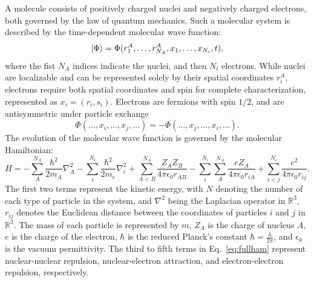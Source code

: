 \documentclass[../main.tex]{subfiles}
\begin{document}
A molecule consists of positively charged nuclei and negatively charged electrons, both governed by the law of quantum mechanics. Such a molecular system is described by the time-dependent molecular wave function:
\begin{equation}
    \ket{\Phi} = \Phi (r_1^A, \dots, r_{N_A}^A,x_1, \dots, x_{N_i},t) , 
\end{equation} where the fist $N_A$ indices indicate the nuclei, and then $N_i$ electrons. While nuclei are localizable and can be represented solely by their spatial coordinates $r_i^A$, electrons require both spatial coordinates and spin for complete characterization, represented as $x_i = (r_i, s_i)$. Electrons are fermions with spin $1/2$, and are antisymmetric under particle exchange
\begin{equation}
    \Phi(\dots, x_i, \dots, x_j, \dots) = - \Phi(\dots, x_j, \dots, x_i, \dots).
\end{equation}
The evolution of the molecular wave function is governed by the molecular Hamiltonian:
\begin{equation}\label{eq:fullham}
    H = -\sum^{N_A}_A \frac{\hbar^2}{2 m_A} \nabla^2_A - \sum^{N_i}_i \frac{\hbar^2}{2 m_e} \nabla^2_i + \sum^{N_A}_{A<B} \frac{Z_A Z_B}{4 \pi \epsilon_0 r_{AB}} - \sum^{N_i}_i \sum^{N_A}_{A} \frac{e Z_A}{4 \pi \epsilon_0 r_{iA}} + \sum^{N_i}_{i<j} \frac{e^2}{4 \pi \epsilon_0 r_{ij}}.
\end{equation} The first two terms represent the kinetic energy, with $N$ denoting the number of each type of particle in the system, and $\nabla^2$ being the Laplacian operator in  $\mathbb{R}^3$, $r_{ij}$ denotes the Euclidean distance between the coordinates of particles $i$ and $j$ in $\mathbb{R}^3$. The mass of each particle is represented by $m$, $Z_A$ is the charge of nucleus $A$, $e$ is the charge of the electron, $\hbar$ is the reduced Planck's constant $\hbar = \frac{h}{2 \pi}$, and $\epsilon_0$ is the vacuum permittivity. The third to fifth terms in Eq.~\ref{eq:fullham} represent nuclear-nuclear repulsion, nuclear-electron attraction, and electron-electron repulsion, respectively.
\end{document}
